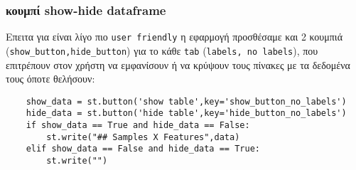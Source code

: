 \documentclass[a4paper,12pt]{article}
\begin{document}
\subsubsection{κουμπί show-hide dataframe}
Επειτα για είναι λίγο πιο \texttt{user friendly} η εφαρμογή προσθέσαμε και 2 κουμπιά (\texttt{show\_button,hide\_button}) για το κάθε \texttt{tab} (\texttt{labels, no labels}), που επιτρέπουν στον χρήστη να εμφανίσουν ή να κρύψουν τους πίνακες με τα δεδομένα τους όποτε θελήσουν:
\begin{lstlisting}
    show_data = st.button('show table',key='show_button_no_labels')
    hide_data = st.button('hide table',key='hide_button_no_labels')
    if show_data == True and hide_data == False:
        st.write("## Samples X Features",data)
    elif show_data == False and hide_data == True:
        st.write("")
\end{lstlisting}




\newpage
\end{document}
